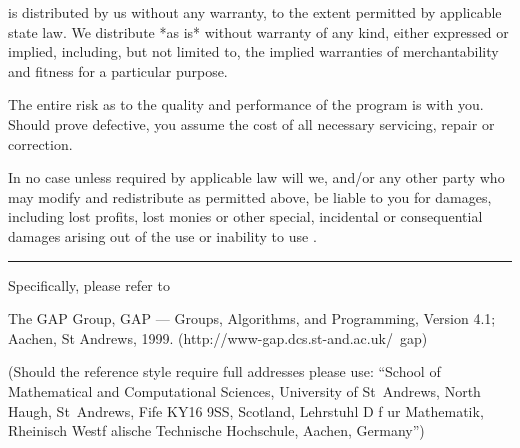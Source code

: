 {\GAP} is distributed by us without any warranty, to the extent permitted
by applicable state law.  We  distribute {\GAP} *as is* without  warranty
of any kind, either expressed or implied, including,  but not limited to,
the implied  warranties  of merchantability and  fitness for a particular
purpose.

The entire risk as to the quality and performance of the program is  with
you.  Should {\GAP} prove defective, you assume the cost of all necessary
servicing, repair or correction.

In no  case  unless  required by applicable law will we, and/or any other
party who  may  modify  and  redistribute  {\GAP}  as permitted above, be
liable  to you for damages, including lost profits, lost monies or  other
special, incidental or consequential damages  arising out  of the  use or
inability to use {\GAP}.

\hrule

Specifically, please refer to

\begintt
[GAP 99] The GAP Group, GAP --- Groups, Algorithms, and Programming,
	 Version 4.1; Aachen, St Andrews, 1999.
         (http://www-gap.dcs.st-and.ac.uk/~gap)
\endtt

(Should the reference style require full addresses please use:
``School of Mathematical and Computational Sciences,
University of St~Andrews,
North Haugh, St~Andrews, Fife KY16 9SS, Scotland,
Lehrstuhl D f{ u}r Mathematik,
Rheinisch Westf{ a}lische Technische Hochschule, Aachen,
Germany'')

